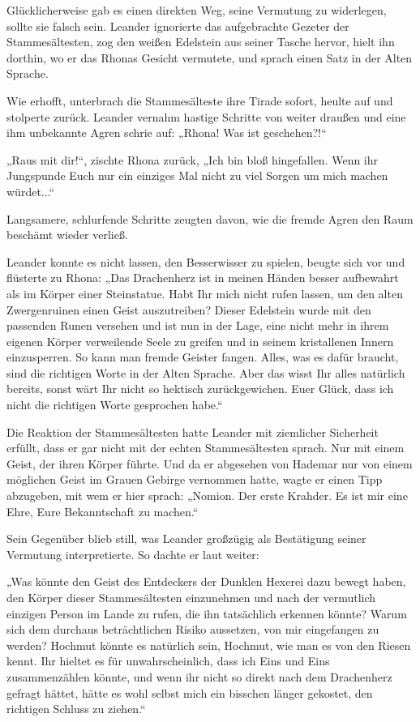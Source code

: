 Glücklicherweise gab es einen direkten Weg, seine Vermutung zu widerlegen, sollte sie falsch sein. Leander ignorierte das aufgebrachte Gezeter der Stammesältesten, zog den weißen Edelstein aus seiner Tasche hervor, hielt ihn dorthin, wo er das Rhonas Gesicht vermutete, und sprach einen Satz in der Alten Sprache.

Wie erhofft, unterbrach die Stammesälteste ihre Tirade sofort, heulte auf und stolperte zurück. Leander vernahm hastige Schritte von weiter draußen und eine ihm unbekannte Agren schrie auf: „Rhona! Was ist geschehen?!“

„Raus mit dir!“, zischte Rhona zurück, „Ich bin bloß hingefallen. Wenn ihr Jungspunde Euch nur ein einziges Mal nicht zu viel Sorgen um mich machen würdet...“

Langsamere, schlurfende Schritte zeugten davon, wie die fremde Agren den Raum beschämt wieder verließ.

Leander konnte es nicht lassen, den Besserwisser zu spielen, beugte sich vor und flüsterte zu Rhona: „Das Drachenherz ist in meinen Händen besser aufbewahrt als im Körper einer Steinstatue. Habt Ihr mich nicht rufen lassen, um den alten Zwergenruinen einen Geist auszutreiben? Dieser Edelstein wurde mit den passenden Runen versehen und ist nun in der Lage, eine nicht mehr in ihrem eigenen Körper verweilende Seele zu greifen und in seinem kristallenen Innern einzusperren. So kann man fremde Geister fangen. Alles, was es dafür braucht, sind die richtigen Worte in der Alten Sprache. Aber das wisst Ihr alles natürlich bereits, sonst wärt Ihr nicht so hektisch zurückgewichen. Euer Glück, dass ich nicht die richtigen Worte gesprochen habe.“

Die Reaktion der Stammesältesten hatte Leander mit ziemlicher Sicherheit erfüllt, dass er gar nicht mit der echten Stammesältesten sprach. Nur mit einem Geist, der ihren Körper führte. Und da er abgesehen von Hademar nur von einem möglichen Geist im Grauen Gebirge vernommen hatte, wagte er einen Tipp abzugeben, mit wem er hier sprach: „Nomion. Der erste Krahder. Es ist mir eine Ehre, Eure Bekanntschaft zu machen.“

Sein Gegenüber blieb still, was Leander großzügig als Bestätigung seiner Vermutung interpretierte. So dachte er laut weiter:

„Was könnte den Geist des Entdeckers der Dunklen Hexerei dazu bewegt haben, den Körper dieser Stammesältesten einzunehmen und nach der vermutlich einzigen Person im Lande zu rufen, die ihn tatsächlich erkennen könnte? Warum sich dem durchaus beträchtlichen Risiko aussetzen, von mir eingefangen zu werden? Hochmut könnte es natürlich sein, Hochmut, wie man es von den Riesen kennt. Ihr hieltet es für unwahrscheinlich, dass ich Eins und Eins zusammenzählen könnte, und wenn ihr nicht so direkt nach dem Drachenherz gefragt hättet, hätte es wohl selbst mich ein bisschen länger gekostet, den richtigen Schluss zu ziehen.“

